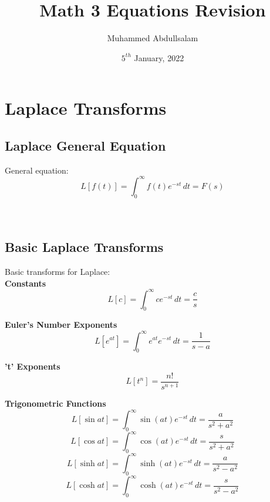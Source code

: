 \documentclass[12pt, a4paper]{article}
\date{$5^{th}$ January, 2022}
\title{Math 3 Equations Revision}
\author{Muhammed Abdullsalam}
\numberwithin{equation}{section}
\begin{document}
	\maketitle
	\tableofcontents
	\pagebreak
	
	\section{Laplace Transforms}
	\label{sec_laplace}
	\subsection{Laplace General Equation}
	General equation:
	\begin{equation}
		L\left[f(t)\right] = \int_{0}^{\infty}f(t) e^{-st}\,dt = F(s)
		\label{eq_laplace}
	\end{equation}
	\\\\
	\subsection{Basic Laplace Transforms}
	Basic transforms for Laplace:\\
	
	\textbf{Constants}
	\begin{equation}
		L[c] = \int_{0}^{\infty}c e^{-st}\,dt = \frac{c}{s}
		\label{eq_laplace_trans_const}
	\end{equation}
	
	\textbf{Euler's Number Exponents}
	\begin{equation}
		L[e^{at}] = \int_{0}^{\infty}e^{at} e^{-st}\,dt = \frac{1}{s - a}
		\label{eq_laplace_trans_euler_exponent}
	\end{equation}
	
	\textbf{'t' Exponents}
	\begin{equation}
		L[t^n] = \frac{n!}{s^{n+1}}
		\label{eq_laplace_trans_t_exponent}
	\end{equation}
	
	\textbf{Trigonometric Functions}
	\begin{equation}
		L[\sin at] = \int_{0}^{\infty}\sin(at) e^{-st}\,dt = \frac{a}{s^2 + a^2}
		\label{eq_laplace_trans_trig_sin}
	\end{equation}
	\begin{equation}
		L[\cos at] = \int_{0}^{\infty}\cos(at) e^{-st}\,dt = \frac{s}{s^2 + a^2}
		\label{eq_laplace_trans_trig_cos}
	\end{equation}
	\begin{equation}
		L[\sinh at] = \int_{0}^{\infty}\sinh(at) e^{-st}\,dt = \frac{a}{s^2 - a^2}
		\label{eq_laplace_trans_trig_sinh}
	\end{equation}
	\begin{equation}
		L[\cosh at] = \int_{0}^{\infty}\cosh(at) e^{-st}\,dt = \frac{s}{s^2 - a^2}
		\label{eq_laplace_trans_trig_cosh}
	\end{equation}
	
\end{document}
